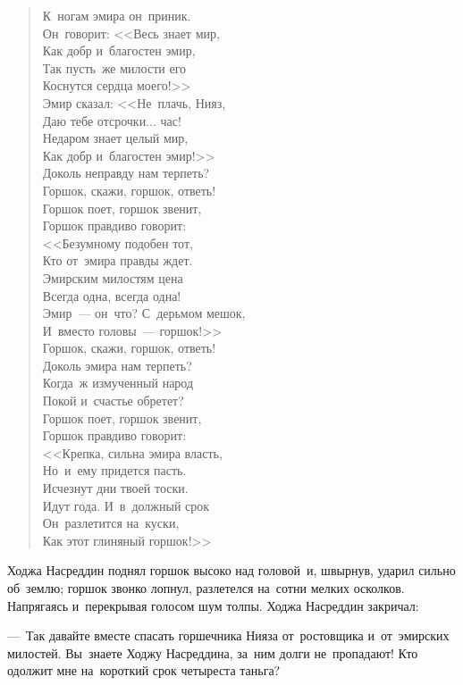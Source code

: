 \documentclass[12pt,a4paper]{book}
\begin{document}
\begin{verse}
К~ногам эмира он~приник. \\
Он~говорит: <<Весь знает мир, \\
Как добр и~благостен эмир, \\
Так пусть~же милости его \\
Коснутся сердца моего!>> \\
Эмир сказал: <<Не~плачь, Нияз, \\
Даю тебе отсрочки... час! \\
Недаром знает целый мир, \\
Как добр и~благостен эмир!>> \\
Доколь неправду нам терпеть? \\
Горшок, скажи, горшок, ответь! \\
Горшок поет, горшок звенит, \\
Горшок правдиво говорит: \\
<<Безумному подобен тот, \\
Кто от~эмира правды ждет. \\
Эмирским милостям цена \\
Всегда одна, всегда одна! \\
Эмир~— он~что? С~дерьмом мешок, \\
И~вместо головы~— горшок!>> \\
Горшок, скажи, горшок, ответь! \\
Доколь эмира нам терпеть? \\
Когда~ж измученный народ \\
Покой и~счастье обретет? \\
Горшок поет, горшок звенит, \\
Горшок правдиво говорит: \\
<<Крепка, сильна эмира власть, \\
Но~и~ему придется пасть. \\
Исчезнут дни твоей тоски. \\
Идут года. И~в~должный срок \\
Он~разлетится на~куски, \\
Как этот глиняный горшок!>>
\end{verse}

Ходжа Насреддин поднял горшок высоко над головой~и, швырнув, ударил сильно об~землю; горшок звонко лопнул, разлетелся на~сотни мелких осколков. Напрягаясь и~перекрывая голосом шум толпы. Ходжа Насреддин закричал:

—~Так давайте вместе спасать горшечника Нияза от~ростовщика и~от~эмирских милостей. Вы~знаете Ходжу Насреддина, за~ним долги не~пропадают! Кто одолжит мне на~короткий срок четыреста таньга?
\end{document}
